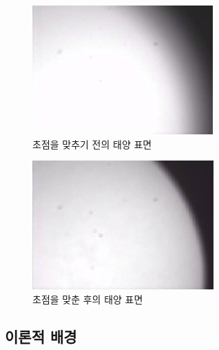 \documentclass{abstract_hutech}
\begin{document}
\begin{figure}
\centering
\includegraphics[width=0.7\linewidth]{before}
\caption{초점을 맞추기 전의 태양 표면}
\label{fig:before}
\end{figure}

\begin{figure}
\centering
\includegraphics[width=0.7\linewidth]{after}
\caption{초점을 맞춘 후의 태양 표면}
\label{fig:after}
\end{figure}

\subsection{이론적 배경}
\end{document}
